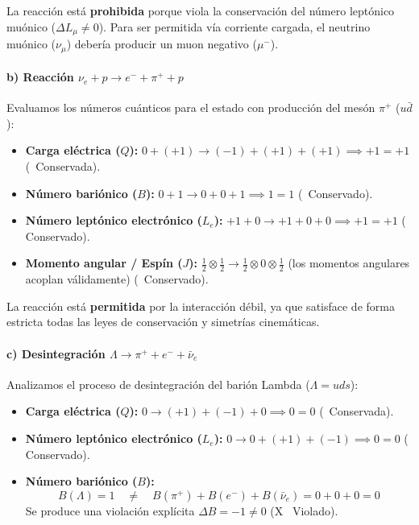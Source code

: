 \begin{problema}
\begin{observacion}
La reacción está \textbf{prohibida} porque viola la conservación del número leptónico muónico ($\Delta L_\mu \neq 0$). Para ser permitida vía corriente cargada, el neutrino muónico ($\nu_\mu$) debería producir un muon negativo ($\mu^-$).
\end{observacion}

\paragraph{b) Reacción $\nu_e + p \to e^- + \pi^+ + p$}
Evaluamos los números cuánticos para el estado con producción del mesón $\pi^+$ ($u\bar{d}$):
\begin{itemize}
    \item \textbf{Carga eléctrica ($Q$):} $0 + (+1) \to (-1) + (+1) + (+1) \implies +1 = +1$ \quad (\checkmark \, Conservada).
    \item \textbf{Número bariónico ($B$):} $0 + 1 \to 0 + 0 + 1 \implies 1 = 1$ \quad (\checkmark \, Conservado).
    \item \textbf{Número leptónico electrónico ($L_e$):} $+1 + 0 \to +1 + 0 + 0 \implies +1 = +1$ \quad (\checkmark \, Conservado).
    \item \textbf{Momento angular / Espín ($J$):} $\frac{1}{2} \otimes \frac{1}{2} \to \frac{1}{2} \otimes 0 \otimes \frac{1}{2}$ (los momentos angulares acoplan válidamente) \quad (\checkmark \, Conservado).
\end{itemize}

\begin{observacion}
La reacción está \textbf{permitida} por la interacción débil, ya que satisface de forma estricta todas las leyes de conservación y simetrías cinemáticas.
\end{observacion}

\paragraph{c) Desintegración $\Lambda \to \pi^+ + e^- + \bar{\nu}_e$}
Analizamos el proceso de desintegración del barión Lambda ($\Lambda = uds$):
\begin{itemize}
    \item \textbf{Carga eléctrica ($Q$):} $0 \to (+1) + (-1) + 0 \implies 0 = 0$ \quad (\checkmark \, Conservada).
    \item \textbf{Número leptónico electrónico ($L_e$):} $0 \to 0 + (+1) + (-1) \implies 0 = 0$ \quad (\checkmark \, Conservado).
    \item \textbf{Número bariónico ($B$):}
    \begin{equation*}
        B(\Lambda) = 1 \quad \neq \quad B(\pi^+) + B(e^-) + B(\bar{\nu}_e) = 0 + 0 + 0 = 0
    \end{equation*}
    Se produce una violación explícita $\Delta B = -1 \neq 0$ \quad (\textsf{X} \, Violado).
\end{itemize}


\end{problema}
